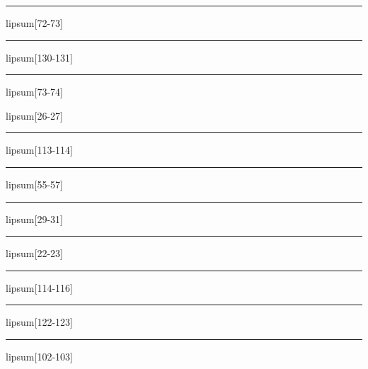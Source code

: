 \documentclass[11pt,a4paper]{article}
\begin{document}
\begin{simplewrap}
  \textcolor{yellow!21}{\rule{5.0cm}{2.2cm}}
\end{simplewrap}
lipsum[72-73]

\begin{simplewrap}
  \textcolor{lime!32}{\rule{3.5cm}{6.0cm}}
\end{simplewrap}
lipsum[130-131]

\begin{simplewrap}
  \textcolor{orange!47}{\rule{5.3cm}{6.2cm}}
\end{simplewrap}
lipsum[73-74]

lipsum[26-27]

\begin{simplewrap}
  \textcolor{yellow!42}{\rule{5.6cm}{5.8cm}}
\end{simplewrap}
lipsum[113-114]

\begin{simplewrap}
  \textcolor{orange!21}{\rule{5.5cm}{9.9cm}}
\end{simplewrap}
lipsum[55-57]

\begin{simplewrap}
  \textcolor{olive!17}{\rule{5.3cm}{4.5cm}}
\end{simplewrap}
lipsum[29-31]

\begin{simplewrap}
  \textcolor{red!58}{\rule{4.1cm}{4.3cm}}
\end{simplewrap}
lipsum[22-23]

\begin{simplewrap}
  \textcolor{orange!34}{\rule{3.9cm}{6.8cm}}
\end{simplewrap}
lipsum[114-116]

\begin{simplewrap}
  \textcolor{olive!28}{\rule{6.0cm}{5.4cm}}
\end{simplewrap}
lipsum[122-123]

\begin{simplewrap}
  \textcolor{lime!21}{\rule{3.0cm}{7.4cm}}
\end{simplewrap}
lipsum[102-103]
\end{document}
